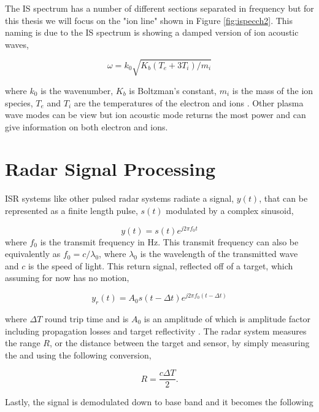 The IS spectrum has a number of different sections separated in frequency but for this thesis we will focus on the "ion line" shown in Figure \ref{fig:ispecch2}. This naming is due to the IS spectrum is showing a damped version of ion acoustic waves,

\begin{equation} 
\label{eqn:ial}
\omega=k_0\sqrt{K_b(T_e+3T_i)/m_i}
\end{equation}

 \noindent where $k_0$ is the wavenumber, $K_b$ is Boltzman's constant, $m_i$ is the mass of the ion species, $T_e$ and $T_i$ are the temperatures of the electron and ions \cite{chen1984introduction}. Other plasma wave modes can be view but ion acoustic mode returns the most power and can give information on both electron and ions.

\section{Radar Signal Processing}
ISR systems like other pulsed radar systems radiate a signal, $y(t)$, that can be represented as a finite length pulse, $s(t)$ modulated by a complex sinusoid,

\begin{equation}
\label{eqn:sigone}
y(t)=s(t)e^{j2\pi f_0 t}
\end{equation}
\noindent where $f_0$ is the transmit frequency in Hz. This transmit frequency can also be equivalently as $ f_0=c/\lambda_0$, where $\lambda_0$ is the wavelength of the transmitted wave and $c$ is the speed of light. This return signal, reflected off of a target, which assuming for now has no motion,

\begin{equation}
\label{eqn:sigone}
y_r(t)=A_0s(t-\Delta t)e^{j2\pi f_0 (t-\Delta t)}
\end{equation}

\noindent where $\Delta T$ round trip time and is $A_0$  is an amplitude of which is amplitude factor including propagation losses and target reflectivity \cite{richards2014fundamentals}. The radar system measures the range $R$, or the distance between the target and sensor, by simply measuring the and using the following conversion,

\begin{equation}
\label{eqn:range_intro}
R=\frac{c\Delta T}{2}.
\end{equation}

\noindent Lastly, the signal is demodulated down to base band and it becomes the following

